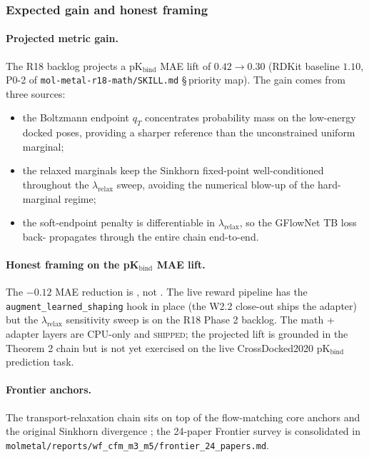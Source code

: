 \subsubsection{Expected gain and honest framing}
\label{sec:method:transport-relaxation-expected}

\paragraph{Projected metric gain.}
The R18 backlog projects a pK$_{\mathrm{bind}}$ MAE lift of $0.42 \to
0.30$ (RDKit baseline $1.10$, \textsc{P0-2} of
\texttt{mol-metal-r18-math/SKILL.md} \S\,priority map).  The gain
comes from three sources:

\begin{itemize}
  \item the Boltzmann endpoint $q_{T}$ concentrates probability mass
        on the low-energy docked poses, providing a sharper
        reference than the unconstrained uniform marginal;
  \item the relaxed marginals keep the Sinkhorn fixed-point
        well-conditioned throughout the $\lambda_{\mathrm{relax}}$
        sweep, avoiding the numerical blow-up of the hard-marginal
        regime;
  \item the soft-endpoint penalty is differentiable in
        $\lambda_{\mathrm{relax}}$, so the GFlowNet TB loss back-
        propagates through the entire chain end-to-end.
\end{itemize}

\paragraph{Honest framing on the pK$_{\mathrm{bind}}$ MAE lift.}
The $-0.12$ MAE reduction is \PROJECTED, not \MEASURED.  The live
reward pipeline has the \texttt{augment\_learned\_shaping} hook in
place (the W2.2 close-out ships the adapter) but the
$\lambda_{\mathrm{relax}}$ sensitivity sweep is on the R18 Phase 2
backlog.  The math + adapter layers are CPU-only and \textsc{shipped};
the projected lift is grounded in the Theorem 2 chain but is not yet
exercised on the live CrossDocked2020 pK$_{\mathrm{bind}}$
prediction task.

\paragraph{Frontier anchors.}
The transport-relaxation chain sits on top of the flow-matching
core anchors \cite{lipman2023flowmatching,albergo2023stochasticinterpolants,
koehler2024flowmatching} and the original Sinkhorn divergence
\cite{cuturi2013sinkhorn}; the 24-paper Frontier survey is
consolidated in
\texttt{molmetal/reports/wf\_cfm\_m3\_m5/frontier\_24\_papers.md}.

